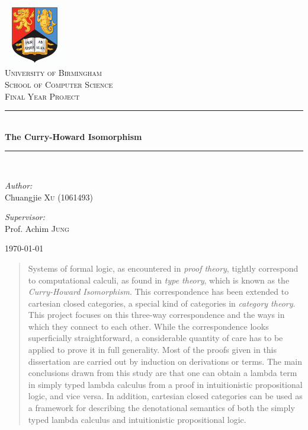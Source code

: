 \documentclass[11pt,a4paper,fleqn]{article}
\theoremstyle{definition}
\theoremstyle{plain}
\theoremstyle{plain}
\theoremstyle{definition}
\begin{document}
\begin{titlepage}
\begin{center}
\includegraphics[width=0.2\textwidth]{./images/bham_logo}\\[1cm]
\textsc{\LARGE University of Birmingham}\\[0.5cm]
\textsc{\Large School of Computer Science}\\[1.5cm]
\textsc{\large Final Year Project}\\[0.3cm]
\rule{\linewidth}{0.5mm} \\[0.6cm]
{ \huge \bfseries The Curry-Howard Isomorphism}\\[0.1cm]
\rule{\linewidth}{0.5mm} \\[1.5cm]
\begin{minipage}{0.4\textwidth}
\begin{flushleft} \large
\emph{Author:}\\
Chuangjie \textsc{Xu} (1061493)
\end{flushleft}
\end{minipage}
\begin{minipage}{0.4\textwidth}
\begin{flushright} \large
\emph{Supervisor:} \\
Prof. Achim \textsc{Jung}
\end{flushright}
\end{minipage}
\vfill
{\large \today}
\end{center}
\end{titlepage}

\cfoot{\thepage}
\begin{abstract}
Systems of formal logic, as encountered in \emph{proof theory}, tightly correspond to computational calculi, as found in \emph{type theory}, which is known as the \emph{Curry-Howard Isomorphism}. This correspondence has been extended to cartesian closed categories, a special kind of categories in \emph{category theory}. This project focuses on this three-way correspondence and the ways in which they connect to each other. While the correspondence looks superficially straightforward, a considerable quantity of care has to be applied to prove it in full generality. Most of the proofs given in this dissertation are carried out by induction on derivations or terms. The main conclusions drawn from this study are that one can obtain a lambda term in simply typed lambda calculus from a proof in intuitionistic propositional logic, and vice versa. In addition, cartesian closed categories can be used as a framework for describing the denotational semantics of both the simply typed lambda calculus and intuitionistic propositional logic.\\[50pt]
\end{abstract}
\end{document}
